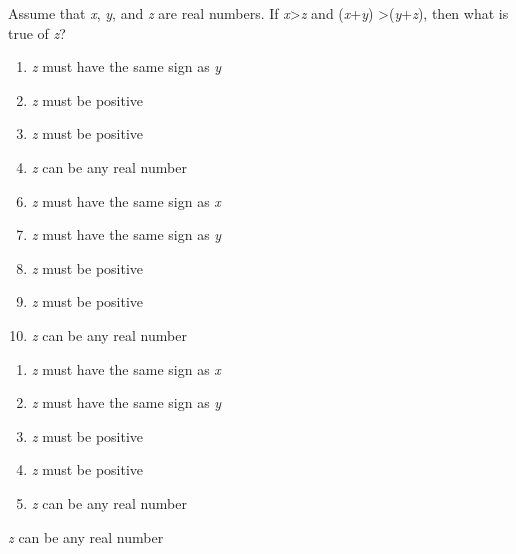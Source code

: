 Assume that \textit{x}, \textit{y}, and \textit{z} are real numbers. If \textit{x}\textgreater\textit{z} and (\textit{x}+\textit{y}) \textgreater (\textit{y}+\textit{z}), then what is true of \textit{z}?

\ifsat
	\begin{enumerate}[label=\Alph*)]
		\item  \textit{z} must have the same sign as \textit{y} 
		\item  \textit{z} must be positive 
		\item  \textit{z} must be positive 
		\item  \textit{z} can be any real number %
	\end{enumerate}
\else
\fi

\ifacteven
	\begin{enumerate}[label=\textbf{\Alph*.},itemsep=\fill,align=left]
		\setcounter{enumii}{5}
		\item   \textit{z} must have the same sign as \textit{x}
		\item  \textit{z} must have the same sign as \textit{y} 
		\item  \textit{z} must be positive
		\addtocounter{enumii}{1}
		\item  \textit{z} must be positive 
		\item  \textit{z} can be any real number %
	\end{enumerate}
\else
\fi

\ifactodd
	\begin{enumerate}[label=\textbf{\Alph*.},itemsep=\fill,align=left]
		\item   \textit{z} must have the same sign as \textit{x}
		\item  \textit{z} must have the same sign as \textit{y} 
		\item  \textit{z} must be positive 
		\item  \textit{z} must be positive 
		\item  \textit{z} can be any real number %
	\end{enumerate}
\else
\fi

\ifgridin
  \textit{z} can be any real number %

\else
\fi

